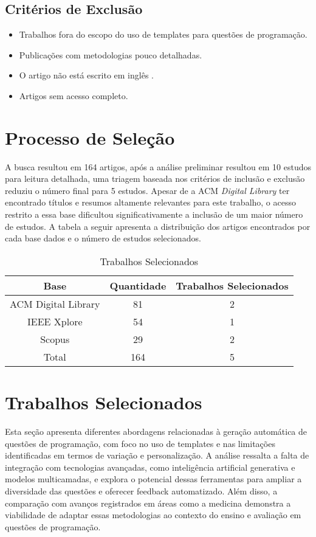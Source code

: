 \subsection{Critérios de Exclusão}
\begin{itemize}
    \item Trabalhos fora do escopo do uso de templates para questões de programação. 
    \item Publicações com metodologias pouco detalhadas. 
    \item O artigo não está escrito em inglês .
    \item Artigos sem acesso completo. 
\end{itemize}

\section{Processo de Seleção}
A busca resultou em 164 artigos, após a análise preliminar resultou em 10 estudos para leitura detalhada, uma triagem baseada nos critérios de inclusão e exclusão reduziu o número final para 5 estudos. Apesar de a ACM \textit{Digital Library} ter encontrado títulos e resumos altamente relevantes para este trabalho, o acesso restrito a essa base dificultou significativamente a inclusão de um maior número de estudos. A tabela a seguir apresenta a distribuição dos artigos encontrados por cada base dados e o número de estudos selecionados.

\begin{table}[htbp]
    \centering
    \begin{tabular}{|c|c|c|}
        \hline
        Base & Quantidade & Trabalhos Selecionados \\ \hline
        ACM Digital Library & 81 & 2 \\ \hline
        IEEE Xplore & 54 & 1 \\ \hline
        Scopus & 29 & 2 \\ \hline
        Total & 164 & 5 \\ \hline
    \end{tabular}
    \caption{Trabalhos Selecionados}
    \label{tab:table-trabalhos-selecionados}
\end{table}


\section{Trabalhos Selecionados}
Esta seção apresenta diferentes abordagens relacionadas à geração automática de questões de programação, com foco no uso de templates e nas limitações identificadas em termos de variação e personalização. A análise ressalta a falta de integração com tecnologias avançadas, como inteligência artificial generativa e modelos multicamadas, e explora o potencial dessas ferramentas para ampliar a diversidade das questões e oferecer feedback automatizado. Além disso, a comparação com avanços registrados em áreas como a medicina demonstra a viabilidade de adaptar essas metodologias ao contexto do ensino e avaliação em questões de programação. 


